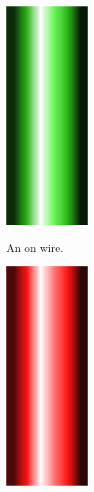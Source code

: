 \documentclass[12pt]{book}
\begin{document}
		\begin{figure}[h]
			\centering
			\begin{subfigure}[t]{0.3\textwidth}
				\centering
				\includegraphics[width=0.3\textwidth]{ON}

				An on wire.
			\end{subfigure}
			\hspace{1mm}
			\begin{subfigure}[t]{0.3\textwidth}
				\centering
				\includegraphics[width=0.3\textwidth]{OFF}


\end{subfigure}
\end{figure}
\end{document}
